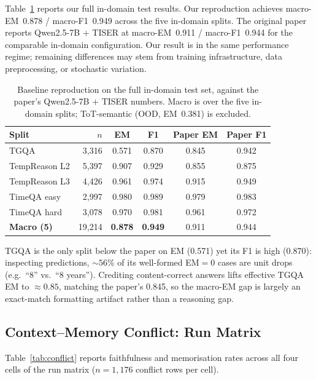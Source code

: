 \documentclass[conference]{IEEEtran}
\begin{document}
Table~\ref{tab:baseline} reports our full in-domain test results. Our reproduction achieves macro-EM~0.878 / macro-F1~0.949 across the five in-domain splits. The original paper reports Qwen2.5-7B + TISER at macro-EM~0.911 / macro-F1~0.944 for the comparable in-domain configuration. Our result is in the same performance regime; remaining differences may stem from training infrastructure, data preprocessing, or stochastic variation.

\begin{table}[t]
\centering
\caption{Baseline reproduction on the full in-domain test set, against the paper's Qwen2.5-7B + TISER numbers. Macro is over the five in-domain splits; ToT-semantic (OOD, EM~0.381) is excluded.}
\label{tab:baseline}
\setlength{\tabcolsep}{4pt}
{\footnotesize
\begin{tabular}{lrcccc}
\toprule
\textbf{Split} & \textbf{$n$} & \textbf{EM} & \textbf{F1} & \textbf{Paper EM} & \textbf{Paper F1} \\
\midrule
TGQA            & 3{,}316 & 0.571 & 0.870 & 0.845 & 0.942 \\
TempReason L2   & 5{,}397 & 0.907 & 0.929 & 0.855 & 0.875 \\
TempReason L3   & 4{,}426 & 0.961 & 0.974 & 0.915 & 0.949 \\
TimeQA easy     & 2{,}997 & 0.980 & 0.989 & 0.979 & 0.983 \\
TimeQA hard     & 3{,}078 & 0.970 & 0.981 & 0.961 & 0.972 \\
\midrule
\textbf{Macro (5)} & 19{,}214 & \textbf{0.878} & \textbf{0.949} & 0.911 & 0.944 \\
\bottomrule
\end{tabular}
}
\end{table}

TGQA is the only split below the paper on EM (0.571) yet its F1 is high (0.870): inspecting predictions, ${\sim}56\%$ of its well-formed EM$=$0 cases are unit drops (e.g.\ ``8'' vs.\ ``8 years''). Crediting content-correct answers lifts effective TGQA EM to ${\approx}0.85$, matching the paper's 0.845, so the macro-EM gap is largely an exact-match formatting artifact rather than a reasoning gap.

\subsection{Context--Memory Conflict: Run Matrix}

Table~\ref{tab:conflict} reports faithfulness and memorisation rates across all four cells of the run matrix ($n{=}1{,}176$ conflict rows per cell).
\end{document}
